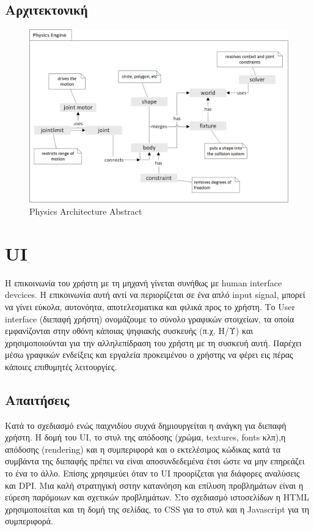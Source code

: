 \subsection{Αρχιτεκτονική}
	\begin{figure}[h!]
		\centering
		\includegraphics[width=165mm]{Images/physics_overview}
		\caption{Physics Architecture Abstract}
		\label{fig:physics abstract}
	\end{figure}
	
\section{UI}
Η επικοινωνία του χρήστη με τη μηχανή γίνεται συνήθως με human interface devcices. Η επικοινωνία αυτή αντί να περιορίζεται σε ένα απλό input signal, μπορεί να γίνει εύκολα, αυτονόητα, αποτελεσματικα και φιλικά προς το χρήστη. Το User interface (διεπαφή χρήστη) ονομάζουμε το σύνολο γραφικών στοιχείων, τα οποία εμφανίζονται στην οθόνη κάποιας ψηφιακής συσκευής (π.χ. Η/Υ) και χρησιμοποιούνται για την αλληλεπίδραση του χρήστη με τη συσκευή αυτή. Παρέχει μέσω γραφικών ενδείξεις και εργαλεία προκειμένου ο χρήστης να φέρει εις πέρας κάποιες επιθυμητές λειτουργίες.

\subsection{Απαιτήσεις}
Κατά το σχεδιασμό ενώς παιχνιδίου συχνά δημιουργείται η ανάγκη για διεπαφή χρήστη. Η δομή του UI, το στυλ της απόδοσης (χρώμα, textures, fonts κλπ),η απόδοσης (rendering) και η συμπεριφορά και ο εκτελέσιμος κώδικας κατά τα συμβάντα της διεπαφής πρέπει να είναι αποσυνδεδεμένα έτσι ώστε να μην επηρεάζει το ένα το άλλο. Επίσης χρησιμεύει όταν το UI προορίζεται για διάφορες αναλύσεις και \Gls{DPI}. Μια καλή στρατηγική σστην κατανόηση και επίλυση προβλημάτων είναι η εύρεση παρόμοιων και σχετικών προβλημάτων. Στο σχεδιασμό ιστοσελίδων η HTML χρησιμοποιείται και τη δομή της σελίδας, το CSS για το στυλ και η Javascript για τη συμπεριφορά.

